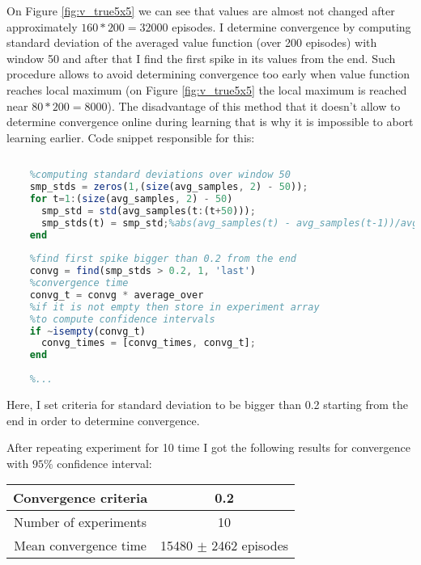 \documentclass[a4paper,11pt]{article}
\theoremstyle{mytheor}
\begin{document}
On Figure \ref{fig:v_true5x5} we can see that values are almost not changed after approximately $160 * 200 = 32000$ episodes. I determine convergence by computing standard deviation of the averaged value function (over 200 episodes) with window 50 and after that I find the first spike in its values from the end. Such procedure allows to avoid determining convergence too early when value function reaches local maximum (on Figure \ref{fig:v_true5x5} the local maximum is reached near $80 * 200 = 8000$). The disadvantage of this method that it doesn't allow to determine convergence online during learning that is why it is impossible to abort learning earlier. 
Code snippet responsible for this:
\begin{lstlisting}[language=Octave]
    %...
    
    %computing standard deviations over window 50
    smp_stds = zeros(1,(size(avg_samples, 2) - 50));
    for t=1:(size(avg_samples, 2) - 50)
      smp_std = std(avg_samples(t:(t+50)));
      smp_stds(t) = smp_std;%abs(avg_samples(t) - avg_samples(t-1))/avg_samples(t);
    end
    
    %find first spike bigger than 0.2 from the end
    convg = find(smp_stds > 0.2, 1, 'last')
    %convergence time
    convg_t = convg * average_over
    %if it is not empty then store in experiment array
    %to compute confidence intervals
    if ~isempty(convg_t)
      convg_times = [convg_times, convg_t];
    end
    
    %...
\end{lstlisting}

Here, I set criteria for standard deviation to be bigger than 0.2 starting from the end in order to determine convergence. 

After repeating experiment for 10 time I got the following results for convergence with $95\%$ confidence interval:

\begin{center}
	\begin{tabular}{| c | c | }
		\hline
		Convergence criteria &  0.2 \\ 
		\hline
		Number of experiments & 10 \\ 
		\hline
	    Mean convergence time & 15480 $\pm$ 2462 episodes \\
		\hline
	\end{tabular}
\end{center}
\end{document}

